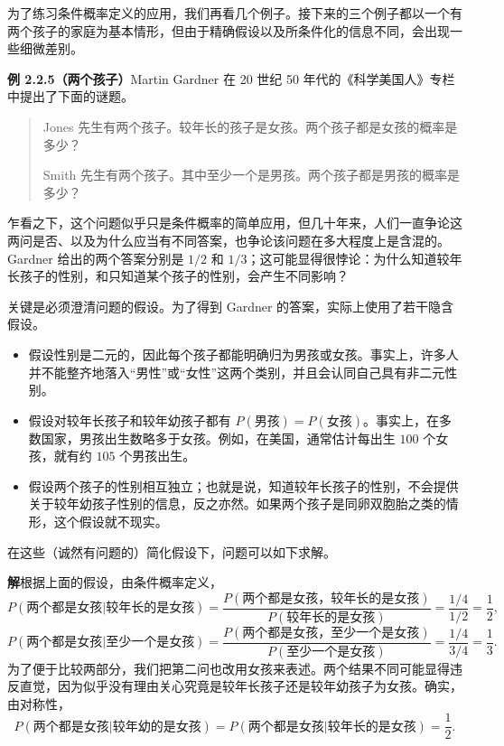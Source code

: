 \documentclass[UTF8, 12pt, fontset=fandol, oneside]{ctexart}
\begin{document}
为了练习条件概率定义的应用，我们再看几个例子。接下来的三个例子都以一个有两个孩子的家庭为基本情形，但由于精确假设以及所条件化的信息不同，会出现一些细微差别。

\noindent\textbf{例 2.2.5（两个孩子）}\quad Martin Gardner 在 20 世纪 50 年代的《科学美国人》专栏中提出了下面的谜题。

\begin{quote}
Jones 先生有两个孩子。较年长的孩子是女孩。两个孩子都是女孩的概率是多少？

Smith 先生有两个孩子。其中至少一个是男孩。两个孩子都是男孩的概率是多少？
\end{quote}

乍看之下，这个问题似乎只是条件概率的简单应用，但几十年来，人们一直争论这两问是否、以及为什么应当有不同答案，也争论该问题在多大程度上是含混的。Gardner 给出的两个答案分别是 $1/2$ 和 $1/3$；这可能显得很悖论：为什么知道较年长孩子的性别，和只知道某个孩子的性别，会产生不同影响？

关键是必须澄清问题的假设。为了得到 Gardner 的答案，实际上使用了若干隐含假设。

\begin{itemize}
  \item 假设性别是二元的，因此每个孩子都能明确归为男孩或女孩。事实上，许多人并不能整齐地落入“男性”或“女性”这两个类别，并且会认同自己具有非二元性别。
  \item 假设对较年长孩子和较年幼孩子都有 $P(\text{男孩})=P(\text{女孩})$。事实上，在多数国家，男孩出生数略多于女孩。例如，在美国，通常估计每出生 $100$ 个女孩，就有约 $105$ 个男孩出生。
  \item 假设两个孩子的性别相互独立；也就是说，知道较年长孩子的性别，不会提供关于较年幼孩子性别的信息，反之亦然。如果两个孩子是同卵双胞胎之类的情形，这个假设就不现实。
\end{itemize}

在这些（诚然有问题的）简化假设下，问题可以如下求解。

\noindent\textbf{解}\quad 根据上面的假设，由条件概率定义，
\[
  P(\text{两个都是女孩}|\text{较年长的是女孩})
  =
  \frac{P(\text{两个都是女孩，较年长的是女孩})}
       {P(\text{较年长的是女孩})}
  =\frac{1/4}{1/2}=\frac12,
\]
\[
  P(\text{两个都是女孩}|\text{至少一个是女孩})
  =
  \frac{P(\text{两个都是女孩，至少一个是女孩})}
       {P(\text{至少一个是女孩})}
  =\frac{1/4}{3/4}=\frac13.
\]
为了便于比较两部分，我们把第二问也改用女孩来表述。两个结果不同可能显得违反直觉，因为似乎没有理由关心究竟是较年长孩子还是较年幼孩子为女孩。确实，由对称性，
\[
  P(\text{两个都是女孩}|\text{较年幼的是女孩})
  =
  P(\text{两个都是女孩}|\text{较年长的是女孩})
  =\frac12.
\]
\end{document}
